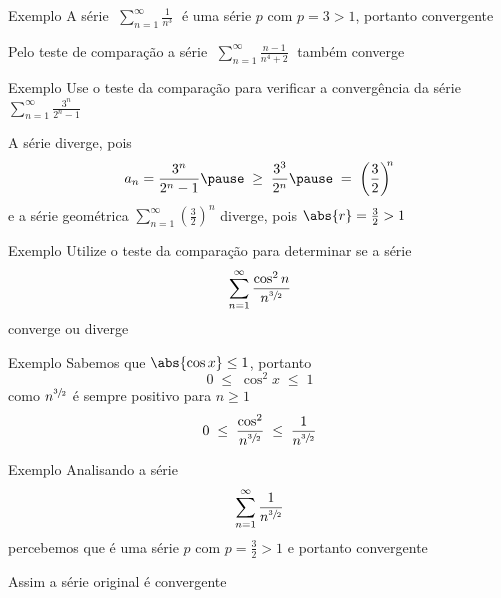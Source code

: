 \begin{frame}{Exemplo \theexemplo}
  A série
  \(\;
    \sum_{n=1}^\infty \frac{1}{n^3}
  \;\)
  é uma série $p$ com $p=3>1$, portanto convergente

  \pause
  \vspace{\baselineskip}
  Pelo teste de comparação a série
  \(\;
    \sum_{n=1}^\infty \frac{n-1}{n^4+2}
  \;\)
  também converge
\end{frame}

\addtocounter{exemplo}{1}
\begin{frame}{Exemplo \theexemplo}
  Use o teste da comparação para verificar a convergência da série
  \(
    \sum_{n=1}^\infty\frac{3^n}{2^n-1}
  \)

  \pause
  \vspace{\baselineskip}
  A série diverge\pause,
  pois
  \[
    a_n = \frac{3^n}{2^n-1}
    \pause
    \;\geq\; \frac{3^3}{2^n}
    \pause
    \;=\;    \left(\frac{3}{2}\right)^{\!\!{n}}
  \]
  \pause
  e a série geométrica
  \(
    \sum_{n=1}^\infty\left(\frac{3}{2}\right)^{\!\!{n}}
  \)
  diverge\pause, pois \quad
  \(
    \abs{r}=\frac{3}{2}>1
  \)
\end{frame}

\addtocounter{exemplo}{1}
\begin{frame}{Exemplo \theexemplo}
  Utilize o teste da comparação para determinar se a série
  \[
    \sum_{n=1}^{\infty} \frac{\cos^2 n}{n^{\sfrac{3}{2}}}
  \]
  converge ou diverge
\end{frame}

\begin{frame}{Exemplo \theexemplo}
  Sabemos que \(\abs{\cos x}\leq 1\)\pause,
  portanto
  \[
    0 \;\leq\;\cos^2 x \;\leq\; 1
  \]
  \pause
  como $n^{\sfrac{3}{2}}$ é sempre positivo para $n\geq 1$
  \[
    0 \;\leq\; \frac{\cos^2}{n^{\sfrac{3}{2}}} \;\leq\; \frac{1}{n^{\sfrac{3}{2}}}
  \]
\end{frame}

\begin{frame}{Exemplo \theexemplo}
  Analisando a série
  \[
    \sum_{n=1}^{\infty} \frac{1}{n^{\sfrac{3}{2}}}
  \]
  percebemos que é uma série $p$ com $p=\frac{3}{2}>1$ e portanto convergente

  \pause
  \vspace{1.5\baselineskip}
  Assim a série original é convergente
\end{frame}

